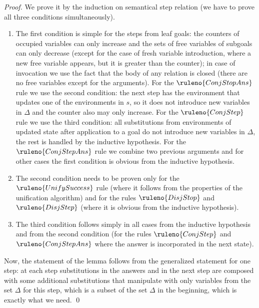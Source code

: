 \begin{proof}
We prove it by the induction on semantical step relation (we have to prove all three conditions simultaneously).

\begin{enumerate}
\item The first condition is simple for the steps from leaf goals: the counters of occupied variables can only increase and the sets of free variables of subgoals can only decrease (except for the case of fresh variable introduction, where a new free variable appears, but it is greater than the counter); in case of invocation we use the fact that the body of any relation is closed (there are no free variables except for the arguments). For the $\ruleno{ConjStopAns}$ rule we use the second condition: the next step has the environment that updates one of the environments in $s$, so it does not introduce new variables in $\Delta$ and the counter also may only increase. For the $\ruleno{ConjStep}$ rule we use the third condition: all substitutions from environments of updated state after application to a goal do not introduce new variables in $\Delta$, the rest is handled by the inductive hypothesis. For the $\ruleno{ConjStepAns}$ rule we combine two previous arguments and for other cases the first condition is obvious from the inductive hypothesis.

\item The second condition needs to be proven only for the $\ruleno{UnifySuccess}$ rule (where it follows from the properties of the unification algorithm) and for the rules $\ruleno{DisjStop}$ and $\ruleno{DisjStep}$ (where it is obvious from the inductive hypothesis).

\item The third condition follows simply in all cases from the inductive hypothesis and from the second condition (for the rules $\ruleno{ConjStep}$ and $\ruleno{ConjStepAns}$ where the answer is incorporated in the next state).
\end{enumerate}

Now, the statement of the lemma follows from the generalized statement for one step: at each step substitutions in the answers and in the next step are composed with some additional substitutions that manipulate with only variables from the set $\Delta$ for this step, which is a subset of the set $\Delta$ in the beginning, which is exactly what we need.
\qed

\end{proof}

